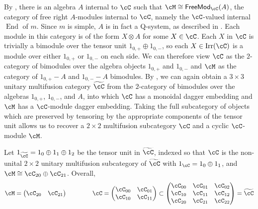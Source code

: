 \documentclass[11pt]{article}
\theoremstyle{plain}
\theoremstyle{definition}
\DeclareMathOperator{\End}{End}
\DeclareMathOperator{\Irr}{Irr}
\newcommand{\FreeMod}{{\sf FreeMod}}
\begin{document}
By \cite{ostrik03}, there is an algebra $A$ internal to $\cC$ such that $\cM\cong\FreeMod_\cC(A)$, the category of free right $A$-modules internal to $\cC$, namely the $\cC$-valued internal $\End$ of $m$. 
Since $m$ is simple, 
$A$ is in fact a Q-system, %
as described in \cite[Rmk.~2.7]{ny17}.  
Each module in this category is of the form $X\otimes A$ for some $X\in\cC$. 
Each $X$ in $\cC$ is trivially a bimodule over the tensor unit $1_{0,+}\oplus1_{0,-}$, so each $X\in\Irr(\cC)$ is a module over either $1_{0,+}$ or $1_{0,-}$ on each side. 
We can therefore view $\cC$ as the $2$-category of bimodules over the algebra objects $1_{0,+}$ and $1_{0,-}$ and $\cM$ as the category of $1_{0,+}-A$ and $1_{0,-}-A$ bimodules. 
By \cite[Thm.~4.1]{ny17}, we can again obtain a $3\times 3$ unitary multifusion category $\widetilde{\cC}$ from the $2$-category of bimodules over the algebras $1_{0,+}$, $1_{0,-}$, and $A$, into which
$\cC$ has a monoidal dagger embedding and $\cM$ has a $\cC$-module dagger embedding.
Taking the full subcategory of objects which are preserved by tensoring by the appropriate components of the tensor unit allows us to recover a $2\times 2$ multifusion subcategory $\cC$ and a cyclic $\cC$-module $\cM$. 



Let $1_{\widetilde{\cC}}= 1_0 \oplus 1_1 \oplus 1_2$ be the tensor unit in $\widetilde{\cC}$, indexed so that $\cC$ is the non-unital $2\times 2$ unitary multifusion subcategory of $\widetilde{\cC}$ with $1_\cC = 1_0\oplus 1_1$, and $\cM\cong\cC_{20}\oplus \cC_{21}$. Overall,
$$
\cM 
=
\begin{pmatrix}
\cC_{20} & \cC_{21} 
\end{pmatrix}
\qquad\qquad
\cC
=
\begin{pmatrix}
\cC_{00} & \cC_{01} 
\\
\cC_{10} & \cC_{11}
\end{pmatrix}
\subset
\begin{pmatrix}
\cC_{00} & \cC_{01} & \cC_{02}
\\
\cC_{10} & \cC_{11} & \cC_{12}
\\
\cC_{20} & \cC_{21} & \cC_{22}
\end{pmatrix}
=
\widetilde{\cC}
$$
\end{document}
